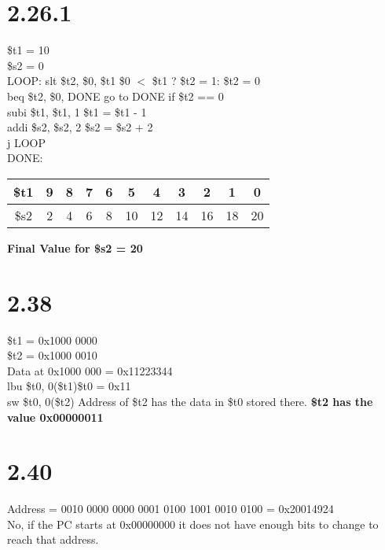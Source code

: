 \documentclass[12pt]{article}
\begin{document}
 \section*{2.26.1}
 \$t1 = 10\\
 \$s2 = 0\\
 LOOP: slt \$t2, \$0, \$t1 \hspace{12mm} \$0 $<$ \$t1 ? \$t2 = 1: \$t2 = 0\\
 \hspace*{15mm}beq \$t2, \$0, DONE  \hspace{4mm}go to DONE if \$t2 == 0\\
 \hspace*{15mm}subi \$t1, \$t1, 1 \hspace{10mm} \$t1 = \$t1 - 1\\
 \hspace*{15mm}addi \$s2, \$s2, 2 \hspace{10mm} \$s2 = \$s2 + 2\\
 j LOOP\\
 DONE:\\
 \newline
 \begin{tabular}{|c|c|c|c|c|c|c|c|c|c|c|}
	 \hline
	 \$t1 & 9 & 8 & 7 & 6 & 5 & 4 & 3 & 2 & 1 & 0\\
	 \hline
	 \$s2 & 2 & 4 & 6 & 8 & 10 & 12 & 14 & 16 & 18 & 20\\
	 \hline
\end{tabular}
\newline
\newline
\textbf{Final Value for \$s2 = 20}

\section*{2.38}
\$t1 = 0x1000 0000\\
\$t2 = 0x1000 0010\\
Data at 0x1000 000 = 0x11223344\\
\newline
lbu \$t0, 0(\$t1)\hspace{10mm}\$t0 = 0x11\\
sw \$t0, 0(\$t2)\hspace{10mm} Address of \$t2 has the data in \$t0 stored there.
\newline
\textbf{\$t2 has the value 0x00000011\\}

\section*{2.40}
Address = 0010 0000 0000 0001 0100 1001 0010 0100 = 0x20014924\\
No, if the PC starts at 0x00000000 it does not have enough bits to change to reach that address.\\
 
\end{document}
